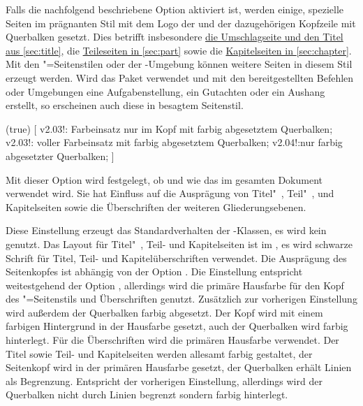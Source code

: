 \begin{DeclareEntity*}{}
\begin{DeclareEntity*}{}
\begin{DeclareEntity*}{}
Falls die nachfolgend beschriebene Option  aktiviert ist, 
werden einige, spezielle Seiten im prägnanten Stil mit dem Logo der \TnUD und 
der dazugehörigen Kopfzeile mit Querbalken gesetzt. Dies betrifft insbesondere 
\hyperref[sec:title]{die Umschlagseite und den Titel aus \autoref{sec:title}}, 
die \hyperref[sec:part]{Teileseiten in \autoref{sec:part}} sowie die
\hyperref[sec:chapter]{Kapitelseiten in \autoref{sec:chapter}}. Mit den 
"=Seitenstilen oder der -Umgebung 
können weitere Seiten in diesem Stil erzeugt werden. Wird das Paket 
 verwendet und mit den bereitgestellten Befehlen oder 
Umgebungen eine Aufgabenstellung, ein Gutachten oder ein Aushang erstellt, so 
erscheinen auch diese in besagtem Seitenstil.
%
\begin{Declaration}
  {}
  (true)
[%
  v2.03!:%
    Farbeinsatz nur im Kopf mit farbig abgesetztem Querbalken;
  v2.03!:%
    voller Farbeinsatz mit farbig abgesetztem Querbalken;%
  v2.04!:nur farbig abgesetzter Querbalken;%
]

Mit dieser Option wird festgelegt, ob und wie das \TUDCD im gesamten Dokument 
verwendet wird. Sie hat Einfluss auf die Ausprägung von Titel"~, Teil"~, und 
Kapitelseiten sowie die Überschriften der weiteren Gliederungsebenen.
\begin{DeclareValues}{}
  Diese Einstellung erzeugt das Standardverhalten der \KOMAScript-Klassen, 
  es wird kein \CD genutzt.
  Das Layout für Titel"~, Teil- und Kapitelseiten ist im \CD, es wird 
  schwarze Schrift für Titel, Teil- und Kapitelüberschriften verwendet. Die 
  Ausprägung des Seitenkopfes ist abhängig von der Option .
  Die Einstellung entspricht weitestgehend der Option , 
  allerdings wird die primäre Hausfarbe  für den Kopf des 
  "=Seitenstils und Überschriften genutzt.
  Zusätzlich zur vorherigen Einstellung wird außerdem der Querbalken farbig 
  abgesetzt.
  Der Kopf wird mit einem farbigen Hintergrund in der Hausfarbe gesetzt, auch 
  der Querbalken wird farbig hinterlegt. Für die Überschriften wird die 
  primären Hausfarbe verwendet.
  Der Titel sowie Teil- und Kapitelseiten werden allesamt farbig gestaltet, 
  der Seitenkopf wird in der primären Hausfarbe  gesetzt, der 
  Querbalken erhält Linien als Begrenzung.
  Entspricht der vorherigen Einstellung, allerdings wird der Querbalken nicht 
  durch Linien begrenzt sondern farbig hinterlegt.
\end{DeclareValues}
\end{Declaration}
%


\end{DeclareEntity*}
\end{DeclareEntity*}
\end{DeclareEntity*}
